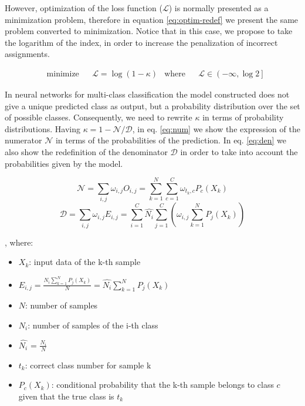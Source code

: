 \documentclass[times,twocolumn,final,authoryear]{elsarticle}
\begin{document}
However, optimization of the loss function ($\mathcal{L}$) is normally presented as a minimization problem, therefore in equation \ref{eq:optim-redef} we present the same problem converted to minimization. Notice that in this case, we propose to take the logarithm of the index, in order to increase the penalization of incorrect assignments.

\begin{equation}
\label{eq:optim-redef}
\begin{aligned}
& \underset{}{\text{minimize}}
& & \mathcal{L} = \log{\left( 1 - \kappa \right)}  & \text{where} & & \mathcal{L} \in \left(-\infty,\log{2}\right]
\end{aligned}
\end{equation}

In neural networks for multi-class classification the model constructed does not give a unique predicted class as output, but a probability distribution over the set of possible classes. Consequently, we need to rewrite $\kappa$ in terms of probability distributions. Having $\kappa=1-\mathcal{N}/\mathcal{D}$, in eq. \ref{eq:num} we show the expression of the numerator $\mathcal{N}$ in terms of the probabilities of the prediction. In eq. \ref{eq:den} we also show the redefinition of the denominator $\mathcal{D}$  in order to take into account the probabilities given by the model. 

\begin{equation}
\label{eq:num}
 \mathcal{N} = \sum_{i,j} \omega_{i,j} O_{i,j} = \sum_{k=1}^N \sum_{c=1}^C \omega_{t_k,c} P_c(X_k) 
\end{equation}
\begin{equation}
\label{eq:den}
\mathcal{D} = \sum_{i,j} \omega_{i,j} E_{i,j} = \sum_{i=1}^C \hat{N_i} \sum_{j=1}^C \left( \omega_{i,j} \sum_{k=1}^N P_j(X_k)\right)
\end{equation}

, where:
\begin{itemize}
	\item[] $X_k$: input data of the k-th sample
	\item[] $E_{i,j} = \frac{N_i \sum_{k=1}^N P_j(X_k)}{N} = \hat{N_i} \sum_{k=1}^N P_j(X_k)$
	\item[] $N$: number of samples
	\item[] $N_i$: number of samples of the i-th class
	\item[] $\hat{N_i}$ = $\frac{N_i}{N}$	
	\item[] $t_k$: correct class number for sample k
	\item[] $P_c(X_k)$:  conditional probability that the k-th sample belongs to class $c$ given that the true class is $t_k$
\end{itemize}
\end{document}
